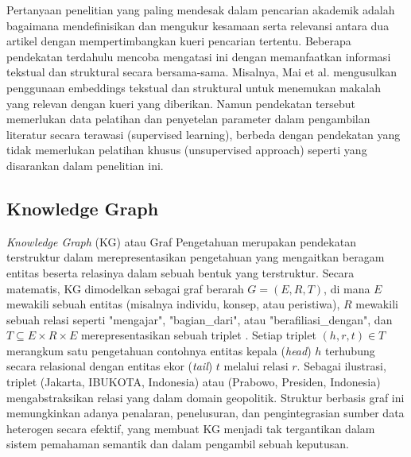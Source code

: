 Pertanyaan penelitian yang paling mendesak dalam pencarian akademik adalah bagaimana mendefinisikan dan mengukur kesamaan serta relevansi antara dua artikel dengan mempertimbangkan kueri pencarian tertentu. Beberapa pendekatan terdahulu mencoba mengatasi ini dengan memanfaatkan informasi tekstual dan struktural secara bersama-sama. Misalnya, Mai et al. mengusulkan penggunaan embeddings tekstual dan struktural untuk menemukan makalah yang relevan dengan kueri yang diberikan. Namun pendekatan tersebut memerlukan data pelatihan dan penyetelan parameter dalam pengambilan literatur secara terawasi (supervised learning), berbeda dengan pendekatan yang tidak memerlukan pelatihan khusus (unsupervised approach) seperti yang disarankan dalam penelitian ini.

\subsection{Knowledge Graph}

\textit{Knowledge Graph} (KG) atau Graf Pengetahuan merupakan pendekatan terstruktur dalam merepresentasikan pengetahuan yang mengaitkan beragam entitas beserta relasinya dalam sebuah bentuk yang terstruktur. Secara matematis, KG dimodelkan sebagai graf berarah $G = (E, R, T)$, di mana $E$ mewakili sebuah entitas (misalnya individu, konsep, atau peristiwa), $R$ mewakili sebuah relasi seperti "mengajar", "bagian\_dari", atau "berafiliasi\_dengan", dan $T \subseteq E \times R \times E$ merepresentasikan sebuah triplet \cite{Hogan_2021}. Setiap triplet $(h, r, t) \in T$ merangkum satu pengetahuan contohnya entitas kepala (\textit{head}) $h$ terhubung secara relasional dengan entitas ekor (\textit{tail}) $t$ melalui relasi $r$. Sebagai ilustrasi, triplet (Jakarta, IBUKOTA, Indonesia) atau (Prabowo, Presiden, Indonesia) mengabstraksikan relasi yang dalam domain geopolitik. Struktur berbasis graf ini memungkinkan adanya penalaran, penelusuran, dan pengintegrasian sumber data heterogen secara efektif, yang membuat KG menjadi tak tergantikan dalam sistem pemahaman semantik dan dalam pengambil sebuah keputusan.
		
